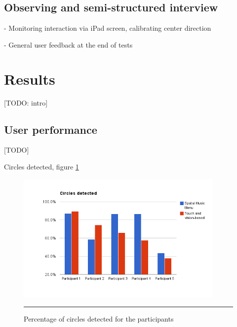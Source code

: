 \subsection{Observing and semi-structured interview}

- Monitoring interaction via iPad screen, calibrating center direction

- General user feedback at the end of tests


\section{Results}
[TODO: intro]

\subsection{User performance}
[TODO]



Circles detected, figure \ref{fig:resultscircles}

\begin{figure}[t]
	\centering
		\includegraphics[width=0.9\textwidth,height=\textheight,keepaspectratio]{./Figures/results_circles.png}
		\rule{35em}{1pt}
	\caption[Results circle detections]{Percentage of circles detected for the participants}
	\label{fig:resultscircles}
\end{figure}


